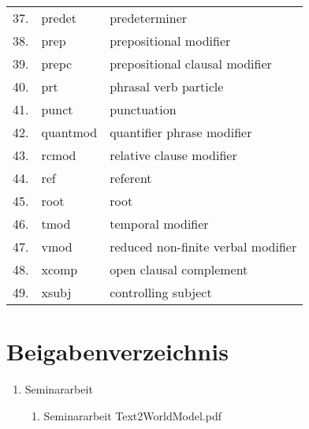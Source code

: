 \begin{longtable}{|l|l|l|}
37. & predet & predeterminer\\
38. & prep & prepositional modifier\\
39. & prepc & prepositional clausal modifier\\
40. & prt & phrasal verb particle\\
41. & punct & punctuation\\
42. & quantmod & quantifier phrase modifier\\
43. & rcmod & relative clause modifier\\
44. & ref & referent\\
45. & root & root\\
46. & tmod & temporal modifier\\
47. & vmod & reduced non-finite verbal modifier\\
48. & xcomp & open clausal complement\\
49. & xsubj & controlling subject\\

\end{longtable}

\section{Beigabenverzeichnis}
\begin{enumerate}
	\item Seminararbeit
	\begin{enumerate}
		\item Seminararbeit Text2WorldModel.pdf
	\end{enumerate}

\end{enumerate} 

